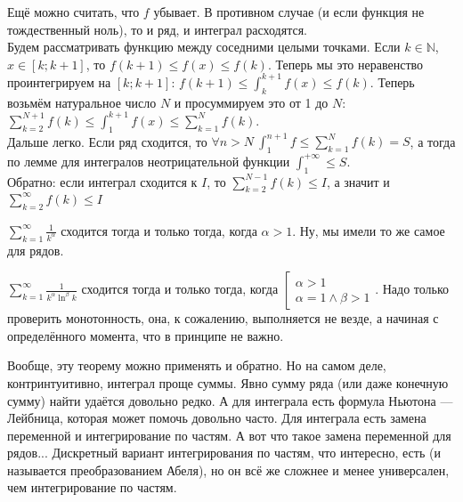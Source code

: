 \documentclass{article}
\begin{document}
\begin{itemize}
\begin{Proof}
            Ещё можно считать, что $f$ убывает. В противном случае (и если функция не тождественный ноль), то и ряд, и интеграл расходятся.\\
            Будем рассматривать функцию между соседними целыми точками. Если $k\in\mathbb N$, $x\in[k;k+1]$, то $f(k+1)\leqslant f(x)\leqslant f(k)$. Теперь мы это неравенство проинтегрируем на $[k;k+1]$: $f(k+1)\leqslant\int_k^{k+1} f(x)\leqslant f(k)$. Теперь возьмём натуральное число $N$ и просуммируем это от 1 до $N$: $\sum\limits_{k=2}^{N+1}f(k)\leqslant\int_1^{k+1}f(x)\leqslant\sum\limits_{k=1}^Nf(k)$.\\
            Дальше легко. Если ряд сходится, то $\forall n>N~\int_1^{n+1}f\leqslant\sum\limits_{k=1}^Nf(k)=S$, а тогда по лемме для интегралов неотрицательной функции $\int_1^{+\infty}\leqslant S$.\\
            Обратно: если интеграл сходится к $I$, то $\sum\limits_{k=2}^{N-1}f(k)\leqslant I$, а значит и $\sum\limits_{k=2}^\infty f(k)\leqslant I$
        \end{Proof}
        \begin{Example}
            $\sum\limits_{k=1}^\infty \frac1{k^\alpha}$ сходится тогда и только тогда, когда $\alpha>1$. Ну, мы имели то же самое для рядов.
        \end{Example}
        \begin{Example}
            $\sum\limits_{k=1}^\infty \frac1{k^\alpha\ln^\beta k}$ сходится тогда и только тогда, когда $\left[\begin{aligned}
                \alpha>1\\
                \alpha=1\land\beta>1
            \end{aligned}\right.$. Надо только проверить монотонность, она, к сожалению, выполняется не везде, а начиная с определённого момента, что в принципе не важно.
        \end{Example}
        \begin{Comment}
            Вообще, эту теорему можно применять и обратно. Но на самом деле, контринтуитивно, интеграл проще суммы. Явно сумму ряда (или даже конечную сумму) найти удаётся довольно редко. А для интеграла есть формула Ньютона --- Лейбница, которая может помочь довольно часто. Для интеграла есть замена переменной и интегрирование по частям. А вот что такое замена переменной для рядов... Дискретный вариант интегрирования по частям, что интересно, есть (и называется преобразованием Абеля), но он всё же сложнее и менее универсален, чем интегрирование по частям.
        \end{Comment}

\end{itemize}
\end{document}

